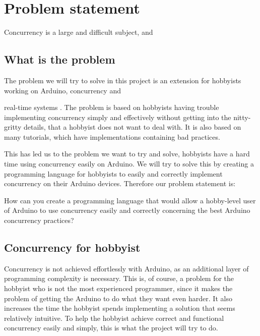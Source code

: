 \section{Problem statement}\label{sec:problemstatement}
Concurrency is a large and difficult subject, and





\subsection{What is the problem}\label{sec:whatistheproblem}
The problem we will try to  solve in this project is an extension for hobbyists working on Arduino, concurrency and 


real-time systems . The problem is based on hobbyists having trouble implementing concurrency simply and effectively without getting into the nitty-gritty details, that a hobbyist does not want to deal with. It is also based on many tutorials, which have implementations containing bad practices.%

This has led us to the problem we want to try and solve, hobbyists have a hard time using concurrency easily on Arduino. We will try to solve this by creating a programming language for hobbyists to easily and correctly implement concurrency on their Arduino devices. Therefore our problem statement is:

How can you create a programming language that would allow a hobby-level user of Arduino to use concurrency easily and correctly concerning the best Arduino concurrency practices?


\subsection{Concurrency for hobbyist} 
Concurrency is not achieved effortlessly with Arduino, as an additional layer of programming complexity is necessary. This is, of course, a problem for the hobbyist who is not the most experienced programmer, since it makes the problem of getting the Arduino to do what they want even harder. It also increases the time the hobbyist spends implementing a solution that seems relatively intuitive. To help the hobbyist achieve correct and functional concurrency easily and simply, this is what the project will try to do.


